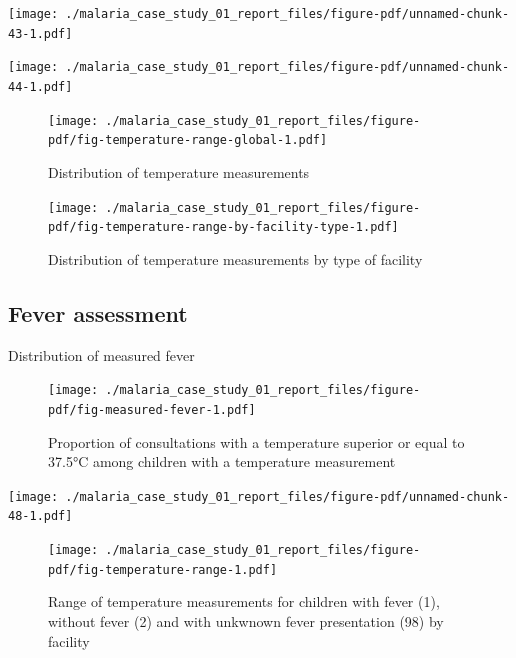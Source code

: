 \documentclass[
  letterpaper,
  DIV=11,
  numbers=noendperiod,
  oneside]{scrreprt}
\begin{document}
\texttt{[image: ./malaria\_case\_study\_01\_report\_files/figure-pdf/unnamed-chunk-43-1.pdf]}

\texttt{[image: ./malaria\_case\_study\_01\_report\_files/figure-pdf/unnamed-chunk-44-1.pdf]}

\begin{figure}

{\centering \texttt{[image: ./malaria\_case\_study\_01\_report\_files/figure-pdf/fig-temperature-range-global-1.pdf]}

}

\caption{\label{fig-temperature-range-global}Distribution of temperature
measurements}

\end{figure}

\begin{figure}

{\centering \texttt{[image: ./malaria\_case\_study\_01\_report\_files/figure-pdf/fig-temperature-range-by-facility-type-1.pdf]}

}

\caption{\label{fig-temperature-range-by-facility-type}Distribution of
temperature measurements by type of facility}

\end{figure}

\hypertarget{fever-assessment-1}{%
\subsection{Fever assessment}\label{fever-assessment-1}}

Distribution of measured fever

\begin{figure}

{\centering \texttt{[image: ./malaria\_case\_study\_01\_report\_files/figure-pdf/fig-measured-fever-1.pdf]}

}

\caption{\label{fig-measured-fever}Proportion of consultations with a
temperature superior or equal to 37.5°C among children with a
temperature measurement}

\end{figure}

\texttt{[image: ./malaria\_case\_study\_01\_report\_files/figure-pdf/unnamed-chunk-48-1.pdf]}

\begin{figure}

{\centering \texttt{[image: ./malaria\_case\_study\_01\_report\_files/figure-pdf/fig-temperature-range-1.pdf]}

}

\caption{\label{fig-temperature-range}Range of temperature measurements
for children with fever (1), without fever (2) and with unkwnown fever
presentation (98) by facility}

\end{figure}
\end{document}
